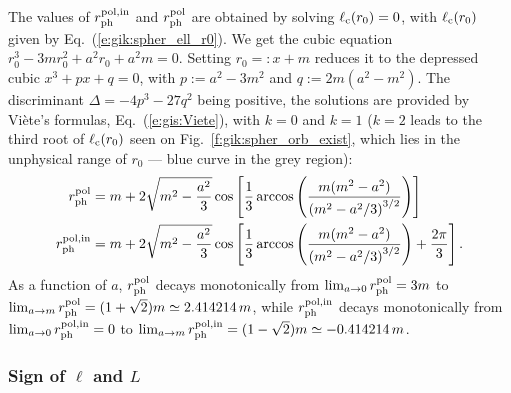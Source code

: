 The values of $r_{\rm ph}^{\rm pol,in}$ and
$r_{\rm ph}^{\rm pol}$ are obtained by solving $\ell_{\rm c}(r_0) = 0$,
with $\ell_{\rm c}(r_0)$ given by Eq.~(\ref{e:gik:spher_ell_r0}). We get the cubic
equation $r_0^3 - 3 m r_0^2 + a^2 r_0 + a^2 m = 0$. Setting $r_0 =: x + m$ reduces
it to the depressed cubic $x^3 + p x + q = 0$, with $p := a^2 - 3 m^2$
and $q := 2m (a^2 - m^2)$. The discriminant $\mathit{\Delta} = - 4 p^3 - 27 q^2$
being positive, the solutions are provided by Viète's formulas, Eq.~(\ref{e:gis:Viete}),
with $k=0$ and $k=1$ ($k=2$ leads to the third root of $\ell_{\rm c}(r_0)$ seen on
Fig.~\ref{f:gik:spher_orb_exist}, which lies
in the unphysical range of $r_0$ --- blue curve in the grey region):
\begin{subequations}
\begin{align}
    r_{\rm ph}^{\rm pol} & = m + 2 \sqrt{m^2 - \frac{a^2}{3}}
        \cos\left[ \frac{1}{3}\arccos \left(
        \frac{m(m^2 - a^2)}{\left( m^2 - {a^2}/{3} \right) ^{3/2}} \right) \right]
        \label{e:gik:rph_pol} \\
    r_{\rm ph}^{\rm pol,in} & = m + 2 \sqrt{m^2 - \frac{a^2}{3}}
        \cos\left[ \frac{1}{3}\arccos \left(
        \frac{m(m^2 - a^2)}{\left( m^2 - {a^2}/{3} \right) ^{3/2}} \right) + \frac{2\pi}{3} \right] .
\end{align}
\end{subequations}
As a function of $a$, $r_{\rm ph}^{\rm pol}$ decays monotonically from
$\lim_{a\to 0} r_{\rm ph}^{\rm pol} = 3 m$ to
$\lim_{a\to m} r_{\rm ph}^{\rm pol} = ( 1 + \sqrt{2}) m \simeq 2.414214\, m$,
while $r_{\rm ph}^{\rm pol,in}$ decays monotonically from
$\lim_{a\to 0} r_{\rm ph}^{\rm pol,in} = 0$ to
$\lim_{a\to m} r_{\rm ph}^{\rm pol,in} = (1 - \sqrt{2}) m \simeq -0.414214\, m$.

\subsubsection{Sign of $\ell$ and $L$}

